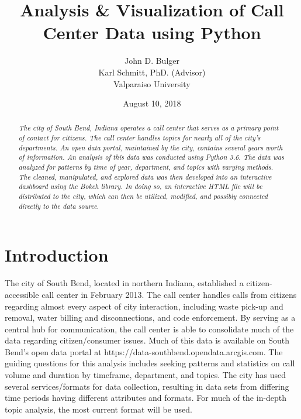 \documentclass[11pt,twocolumn]{article}
\title{Analysis \& Visualization of Call Center Data using Python}
\author{John D. Bulger
\\
Karl Schmitt, PhD. (Advisor)
\\
Valparaiso University\\
}
\date{August 10, 2018}
\begin{document}
\maketitle

\begin{abstract}
\textit{The city of South Bend, Indiana operates a call center that serves as a primary point of contact for citizens.  The call center handles topics for nearly all of the city's departments.  An open data portal, maintained by the city, contains several years worth of information.  An analysis of this data was conducted using Python 3.6.  The data was 
analyzed for patterns by time of year, department, and topics with varying methods.  The cleaned, manipulated, and explored data was then developed into an 
interactive dashboard using the Bokeh library.  In doing so, an interactive HTML file will be distributed to the city, which can then be utilized, modified, and possibly connected 
directly to the data source}.
\end{abstract}

\section{Introduction}
The city of South Bend, located in northern Indiana, established a citizen-accessible call center in February 2013.  The call center handles calls from citizens regarding almost every aspect of city interaction, including waste pick-up and removal, water billing and disconnections, 
and code enforcement.  By serving as a central hub for communication, the call center is able to consolidate much of the data regarding citizen/consumer issues.  
Much of this data is available on South Bend's open data portal at https://data-southbend.opendata.arcgis.com.  The guiding questions for this analysis includes seeking patterns and statistics on call volume and duration by timeframe, department, and topics.  The city has used several services/formats for data collection, resulting in data sets from differing time periods having different attributes and formats.  For much of the in-depth topic analysis, the most current format will be used.
\end{document}
